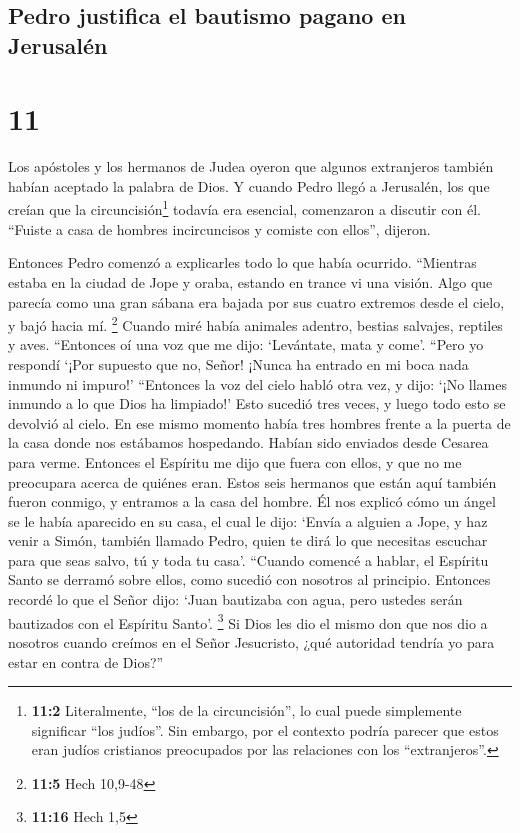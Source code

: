 \hypertarget{pedro-justifica-el-bautismo-pagano-en-jerusaluxe9n}{%
\subsection{Pedro justifica el bautismo pagano en
Jerusalén}\label{pedro-justifica-el-bautismo-pagano-en-jerusaluxe9n}}

\hypertarget{section-10}{%
\section{11}\label{section-10}}

 Los apóstoles y los hermanos de Judea oyeron que algunos
extranjeros también habían aceptado la palabra de Dios.  Y
cuando Pedro llegó a Jerusalén, los que creían que la
circuncisión\footnote{\textbf{11:2} Literalmente, ``los de la
  circuncisión'', lo cual puede simplemente significar ``los judíos''.
  Sin embargo, por el contexto podría parecer que estos eran judíos
  cristianos preocupados por las relaciones con los ``extranjeros''.}
todavía era esencial, comenzaron a discutir con él. 
``Fuiste a casa de hombres incircuncisos y comiste con ellos'', dijeron.

 Entonces Pedro comenzó a explicarles todo lo que había
ocurrido.  ``Mientras estaba en la ciudad de Jope y oraba,
estando en trance vi una visión. Algo que parecía como una gran sábana
era bajada por sus cuatro extremos desde el cielo, y bajó hacia mí.
\footnote{\textbf{11:5} Hech 10,9-48}  Cuando miré había
animales adentro, bestias salvajes, reptiles y aves. 
``Entonces oí una voz que me dijo: `Levántate, mata y come'.
 ``Pero yo respondí `¡Por supuesto que no, Señor! ¡Nunca
ha entrado en mi boca nada inmundo ni impuro!'  ``Entonces
la voz del cielo habló otra vez, y dijo: `¡No llames inmundo a lo que
Dios ha limpiado!'  Esto sucedió tres veces, y luego todo
esto se devolvió al cielo.  En ese mismo momento había
tres hombres frente a la puerta de la casa donde nos estábamos
hospedando. Habían sido enviados desde Cesarea para verme.
 Entonces el Espíritu me dijo que fuera con ellos, y que
no me preocupara acerca de quiénes eran. Estos seis hermanos que están
aquí también fueron conmigo, y entramos a la casa del hombre.
 Él nos explicó cómo un ángel se le había aparecido en su
casa, el cual le dijo: `Envía a alguien a Jope, y haz venir a Simón,
también llamado Pedro,  quien te dirá lo que necesitas
escuchar para que seas salvo, tú y toda tu casa'. 
``Cuando comencé a hablar, el Espíritu Santo se derramó sobre ellos,
como sucedió con nosotros al principio.  Entonces recordé
lo que el Señor dijo: `Juan bautizaba con agua, pero ustedes serán
bautizados con el Espíritu Santo'. \footnote{\textbf{11:16} Hech 1,5}
 Si Dios les dio el mismo don que nos dio a nosotros
cuando creímos en el Señor Jesucristo, ¿qué autoridad tendría yo para
estar en contra de Dios?''

